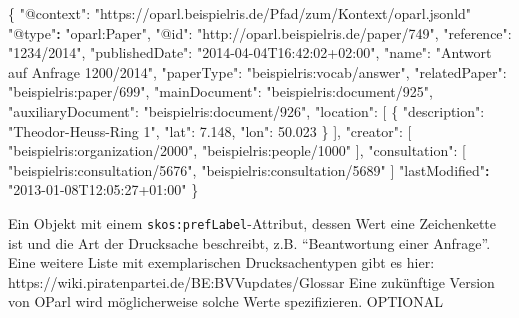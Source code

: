 \documentclass[,a4paper]{article}
\newenvironment{Shaded}{}{}
\newcommand{\DataTypeTok}[1]{\textcolor[rgb]{0.56,0.13,0.00}{{#1}}}
\newcommand{\FloatTok}[1]{\textcolor[rgb]{0.25,0.63,0.44}{{#1}}}
\newcommand{\StringTok}[1]{\textcolor[rgb]{0.25,0.44,0.63}{{#1}}}
\newcommand{\ErrorTok}[1]{\textcolor[rgb]{1.00,0.00,0.00}{\textbf{{#1}}}}
\newcommand{\NormalTok}[1]{{#1}}
\begin{document}
\begin{Shaded}
\begin{Highlighting}[]
\NormalTok{\{}
    \DataTypeTok{"@context"}\NormalTok{: }\StringTok{"https://oparl.beispielris.de/Pfad/zum/Kontext/oparl.jsonld"}
    \StringTok{"@type"}\ErrorTok{:} \StringTok{"oparl:Paper"}\NormalTok{,}
    \DataTypeTok{"@id"}\NormalTok{: }\StringTok{"http://oparl.beispielris.de/paper/749"}\NormalTok{,}
    \DataTypeTok{"reference"}\NormalTok{: }\StringTok{"1234/2014"}\NormalTok{,}
    \DataTypeTok{"publishedDate"}\NormalTok{: }\StringTok{"2014-04-04T16:42:02+02:00"}\NormalTok{,}
    \DataTypeTok{"name"}\NormalTok{: }\StringTok{"Antwort auf Anfrage 1200/2014"}\NormalTok{,}
    \DataTypeTok{"paperType"}\NormalTok{: }\StringTok{"beispielris:vocab/answer"}\NormalTok{,}
    \DataTypeTok{"relatedPaper"}\NormalTok{: }\StringTok{"beispielris:paper/699"}\NormalTok{,}
    \DataTypeTok{"mainDocument"}\NormalTok{: }\StringTok{"beispielris:document/925"}\NormalTok{,}
    \DataTypeTok{"auxiliaryDocument"}\NormalTok{: }\StringTok{"beispielris:document/926"}\NormalTok{,}
    \DataTypeTok{"location"}\NormalTok{: [}
        \NormalTok{\{}
            \DataTypeTok{"description"}\NormalTok{: }\StringTok{"Theodor-Heuss-Ring 1"}\NormalTok{,}
            \DataTypeTok{"lat"}\NormalTok{: }\FloatTok{7.148}\NormalTok{,}
            \DataTypeTok{"lon"}\NormalTok{: }\FloatTok{50.023}
        \NormalTok{\}}
    \NormalTok{],}
    \DataTypeTok{"creator"}\NormalTok{: [}
        \StringTok{"beispielris:organization/2000"}\NormalTok{,}
        \StringTok{"beispielris:people/1000"}
    \NormalTok{],}
    \DataTypeTok{"consultation"}\NormalTok{: [}
        \StringTok{"beispielris:consultation/5676"}\NormalTok{,}
        \StringTok{"beispielris:consultation/5689"}
    \NormalTok{]}
    \StringTok{"lastModified"}\ErrorTok{:} \StringTok{"2013-01-08T12:05:27+01:00"}
\NormalTok{\}}
\end{Highlighting}
\end{Shaded}

\begin{description}
\itemsep1pt\parskip0pt
\item[\texttt{paperType}]
Ein Objekt mit einem \texttt{skos:prefLabel}-Attribut, dessen Wert eine
Zeichenkette ist und die Art der Drucksache beschreibt, z.B.
``Beantwortung einer Anfrage''. Eine weitere Liste mit exemplarischen
Drucksachentypen gibt es hier:
https://wiki.piratenpartei.de/BE:BVVupdates/Glossar Eine zukünftige
Version von OParl wird möglicherweise solche Werte spezifizieren.
OPTIONAL
\end{description}
\end{document}
